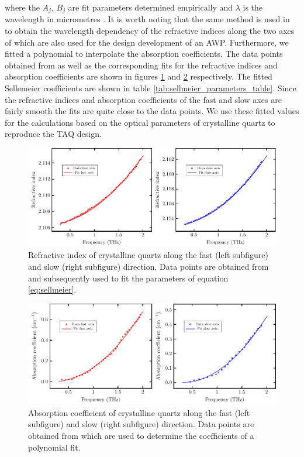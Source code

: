 where the $A_j$, $B_j$ are fit parameters determined empirically and $\lambda$ is the wavelength in micrometres \cite{Sellmeier1872}. It is worth noting that the same method is used in \cite{Vilas2013} to obtain the wavelength dependency of the refractive indices along the two axes of  which are also used for the design development of an AWP. Furthermore, we fitted a polynomial to interpolate the absorption coefficients. The data points obtained from \cite{DGrischkowsky1990} as well as the corresponding fits for the refractive indices and absorption coefficients are shown in figures \ref{fig:ri_quartz} and \ref{fig:abs_quartz} respectively. The fitted Sellemeier coefficients are shown in table \ref{tab:sellmeier_parameters_table}. Since the refractive indices and absorption coefficients of the fast and slow axes are fairly smooth the fits are quite close to the data points. We use these fitted values for the calculations based on the optical parameters of crystalline quartz to reproduce the TAQ design.

\begin{figure}[H]
    \centering
    \includegraphics[scale=0.7]{images/appendix/plots/quartz_fits/ri_quartz.pdf}
    \caption{Refractive index of crystalline quartz along the fast (left subfigure) and slow (right subfigure) direction. Data points are obtained from \cite{DGrischkowsky1990} and subsequently used to fit the parameters of equation \ref{eq:sellmeier}.}
    \label{fig:ri_quartz}
\end{figure}

\begin{figure}[H]
    \centering
    \includegraphics[scale=0.7]{images/appendix/plots/quartz_fits/abs_quartz.pdf}
    \caption{Absorption coefficient of crystalline quartz along the fast (left subfigure) and slow (right subfigure) direction. Data points are obtained from \cite{DGrischkowsky1990} which are used to determine the coefficients of a polynomial fit.}
    \label{fig:abs_quartz}
\end{figure}

